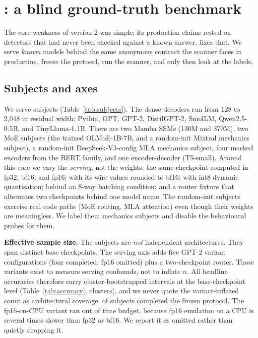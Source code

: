 \section{\benchname: a blind ground-truth benchmark}
\label{sec:bench}
The core weakness of version 2 was simple: its production claims rested on detectors
that had never been checked against a known answer.  \benchname{} fixes that.  We
serve \emph{known} models behind the same anonymous contract the scanner faces in
production, freeze the protocol, run the scanner, and only then look at the labels.

\subsection{Subjects and axes}
We serve \BenchN{} subjects (Table~\ref{tab:subjects}).  The dense decoders run from
128 to 2{,}048 in residual width: Pythia, OPT, GPT-2, DistilGPT-2, SmolLM, Qwen2.5-0.5B,
and TinyLlama-1.1B.  There are two Mamba SSMs (130M and 370M), two MoE subjects (the
trained OLMoE-1B-7B, and a random-init Mixtral mechanics subject), a random-init
DeepSeek-V3-config MLA mechanics subject, four masked encoders from the BERT family, and
one encoder-decoder (T5-small).  Around this core we vary the \emph{serving}, not the
weights: the same checkpoint computed in fp32, bf16, and fp16; with its wire values
rounded to bf16; with int8 dynamic quantisation; behind an 8-way batching condition;
and a router fixture that alternates two checkpoints behind one model name.  The
random-init subjects exercise real code paths (MoE routing, MLA attention) even though
their weights are meaningless.  We label them mechanics subjects and disable the
behavioural probes for them.

\textbf{Effective sample size.}  The \BenchN{} subjects are \emph{not} \BenchN{}
independent architectures.  They span \BenchArchs{} distinct base checkpoints.  The
serving axis adds five GPT-2 variant configurations (four completed; fp16 omitted) plus a
two-checkpoint router.  Those variants exist to measure serving confounds, not to
inflate $n$.  All headline accuracies therefore carry cluster-bootstrapped intervals at
the base-checkpoint level (Table~\ref{tab:accuracy}, \BenchClusters{} clusters), and we
never quote the variant-inflated count as architectural coverage.  \BenchNScored{} of
\BenchN{} subjects completed the frozen protocol.  The fp16-on-CPU variant ran out of
time budget, because fp16 emulation on a CPU is several times slower than fp32 or bf16.
We report it as omitted rather than quietly dropping it.

